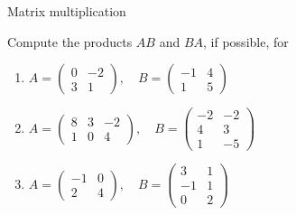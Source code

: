 \documentclass[9pt]{beamer}
\begin{document}
\begin{frame}{Matrix multiplication}

        
        Compute the products $AB$ and $BA$, if possible, for
        \vspace{0.2cm}
        
        \begin{enumerate}[leftmargin = 0.5cm, label = (\alph*), rightmargin = 0.2cm]

            \item 
            $
            A = 
            \begin{pmatrix}
            0 & -2 \\
            3 & 1
            \end{pmatrix},\quad 
            B = 
            \begin{pmatrix}
            -1 & 4 \\
            1  & 5  
            \end{pmatrix}
            $
            \vspace{0.2cm}
            
            \item 
            $
            A = 
            \begin{pmatrix}
            8 & 3 & -2 \\
            1 & 0 & 4 
            \end{pmatrix},\quad 
            B = 
            \begin{pmatrix}
            -2 & -2 \\
            4  & 3 \\
            1  & -5
            \end{pmatrix}
            $
            \vspace{0.2cm}

            \item 
            $
            A = 
            \begin{pmatrix}
            -1 & 0 \\
             2 & 4
            \end{pmatrix},\quad 
            B = 
            \begin{pmatrix}
            3  & 1 \\
            -1 & 1 \\
            0  & 2
            \end{pmatrix}
            $
            \vspace{0.2cm}


\end{enumerate}
\end{frame}
\end{document}
